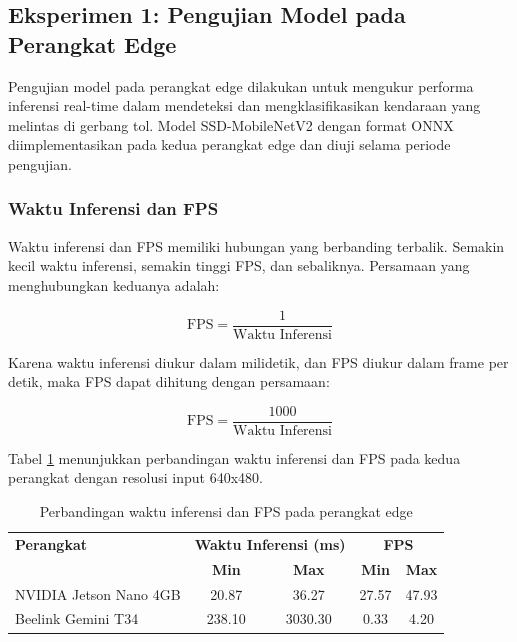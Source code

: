 \subsection{Eksperimen 1: Pengujian Model pada Perangkat Edge}
\label{sec:eksperimen1}

Pengujian model pada perangkat edge dilakukan untuk mengukur performa inferensi real-time dalam mendeteksi dan mengklasifikasikan kendaraan yang melintas di gerbang tol. Model SSD-MobileNetV2 dengan format ONNX diimplementasikan pada kedua perangkat edge dan diuji selama periode pengujian.

\subsubsection{Waktu Inferensi dan FPS}

Waktu inferensi dan FPS memiliki hubungan yang berbanding terbalik. Semakin kecil waktu inferensi, semakin tinggi FPS, dan sebaliknya. Persamaan yang menghubungkan keduanya adalah:

\begin{equation}
  \mbox{FPS} = \frac{1}{\mbox{Waktu Inferensi}}
\end{equation}

Karena waktu inferensi diukur dalam milidetik, dan FPS diukur dalam frame per detik, maka FPS dapat dihitung dengan persamaan:

\begin{equation}
  \mbox{FPS} = \frac{1000}{\mbox{Waktu Inferensi}}
\end{equation}

Tabel \ref{tab:inference_time} menunjukkan perbandingan waktu inferensi dan FPS pada kedua perangkat dengan resolusi input 640x480.

\begin{table}[htbp]
  \centering
  \setlength{\tabcolsep}{4pt}
  \small
  \begin{tabular}{|l|c|c|c|c|}
  \hline
  \rowcolor[HTML]{C0C0C0}
  \textbf{Perangkat} & \multicolumn{2}{c|}{\textbf{Waktu Inferensi (ms)}} & \multicolumn{2}{c|}{\textbf{FPS}} \\
  \cline{2-5}
  \rowcolor[HTML]{C0C0C0}
  & \textbf{Min} & \textbf{Max} & \textbf{Min} & \textbf{Max} \\
  \hline
  NVIDIA Jetson Nano 4GB & 20.87 & 36.27 & 27.57 & 47.93 \\
  \hline
  Beelink Gemini T34 & 238.10 & 3030.30 & 0.33 & 4.20 \\
  \hline
  \end{tabular}
  \caption{Perbandingan waktu inferensi dan FPS pada perangkat edge}
  \label{tab:inference_time}
\end{table}

